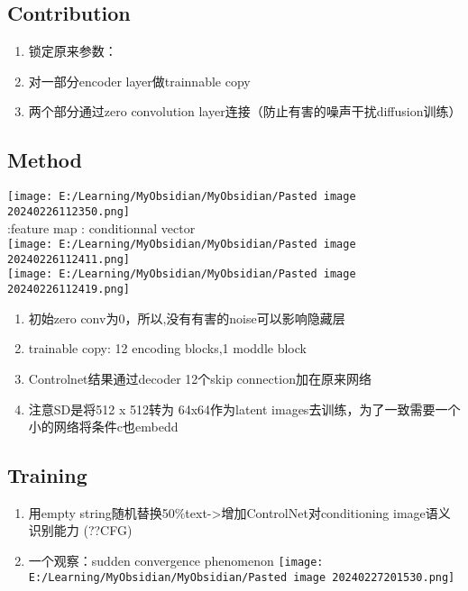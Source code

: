 \documentclass[
]{article}
\providecommand{\tightlist}{%
  \setlength{\itemsep}{0pt}\setlength{\parskip}{0pt}}
\begin{document}
\subsection{Contribution}\label{contribution}

\begin{enumerate}
\tightlist
\item
  锁定原来参数：
\item
  对一部分encoder layer做trainnable copy
\item
  两个部分通过zero convolution
  layer连接（防止有害的噪声干扰diffusion训练）
\end{enumerate}

\subsection{Method}\label{method}

\texttt{[image: E:/Learning/MyObsidian/MyObsidian/Pasted image 20240226112350.png]}\\
{}:feature map {}: conditionnal vector\\
\texttt{[image: E:/Learning/MyObsidian/MyObsidian/Pasted image 20240226112411.png]}\\
\texttt{[image: E:/Learning/MyObsidian/MyObsidian/Pasted image 20240226112419.png]}

\begin{enumerate}
\tightlist
\item
  初始zero conv为0，所以{},没有有害的noise可以影响隐藏层
\item
  trainable copy: 12 encoding blocks,1 moddle block
\item
  Controlnet结果通过decoder 12个skip connection加在原来网络
\item
  注意SD是将512 x 512转为 64x64作为latent
  images去训练，为了一致需要一个小的网络将条件c也embedd
\end{enumerate}

\subsection{Training}\label{training}

\begin{enumerate}
\tightlist
\item
  用empty
  string随机替换50\%text-\textgreater 增加ControlNet对conditioning
  image语义识别能力 (??CFG)
\item
  一个观察：sudden convergence phenomenon
  \texttt{[image: E:/Learning/MyObsidian/MyObsidian/Pasted image 20240227201530.png]}
\end{enumerate}
\end{document}
